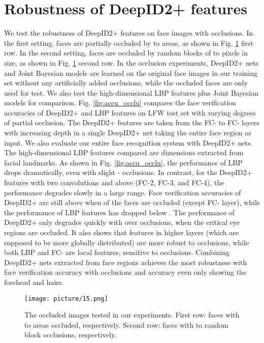 \documentclass[10pt,twocolumn,letterpaper]{article}
\begin{document}
\section{Robustness of DeepID2+ features}
\label{sec:robustness}

We test the robustness of DeepID2+ features on face images with occlusions. In the first setting, faces are partially occluded by  to  areas, as shown in Fig. \ref{fig:img_occlu} first row. In the second setting, faces are occluded by random blocks of  to  pixels in size, as shown in Fig. \ref{fig:img_occlu} second row. In the occlusion experiments, DeepID2+ nets and Joint Bayesian models are learned on the original face images in our training set without any artificially added occlusions, while the occluded faces are only used for test. We also test the high-dimensional LBP features plus Joint Bayesian models \cite{chen2013} for comparison. Fig. \ref{fig:accu_occlu} compares the face verification accuracies of DeepID2+ and LBP features on LFW test set with varying degrees of partial occlusion. The DeepID2+ features are taken from the FC- to FC- layers with increasing depth in a single DeepID2+ net taking the entire face region as input. We also evaluate our entire face recognition system with  DeepID2+ nets. The high-dimensional LBP features compared are  dimensions extracted from  facial landmarks. As shown in Fig. \ref{fig:accu_occlu}, the performance of LBP  drops dramatically, even with slight  -  occlusions. In contrast, for the DeepID2+ features with two convolutions and above (FC-2, FC-3, and FC-4), the performance degrades slowly in a large range. Face verification accuracies of DeepID2+ are still above  when  of the faces are occluded (except FC- layer), while the performance of LBP features has dropped below . The performance of DeepID2+ only degrades quickly with over  occlusions, when the critical eye regions are occluded. It also shows that features in higher layers (which are supposed to be more globally distributed) are more robust to occlusions, while both LBP and FC- are local features, sensitive to occlusions. Combining DeepID2+ nets extracted from  face regions achieves the most robustness with  face verification accuracy with  occlusions and  accuracy even only showing the forehead and hairs.

\begin{figure}[t]
\begin{center}
\texttt{[image: picture/15.png]}
\end{center}
\vspace{-0.15in}
\caption{The occluded images tested in our experiments. First row: faces with  to  areas occluded, respectively. Second row: faces with  to  random block occlusions, respectively.}
\label{fig:img_occlu}
\vspace{-0.1in}
\end{figure}
\end{document}
